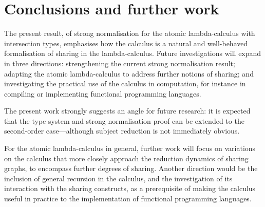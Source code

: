 \documentclass[orivec]{llncs}
\begin{document}
% 
\section{Conclusions and further work}



The present result, of strong normalisation for the atomic lambda-calculus with intersection types, emphasises how the calculus is a natural and well-behaved formalisation of sharing in the lambda-calculus.
%
Future investigations will expand in three directions: strengthening the current strong normalisation result; adapting the atomic lambda-calculus to address further notions of sharing; and investigating the practical use of the calculus in computation, for instance in compiling or implementing functional programming languages.



The present work strongly suggests an angle for future research: it is expected that the type system and strong normalisation proof can be extended to the second-order case---although subject reduction is not immediately obvious.%


For the atomic lambda-calculus in general, further work will focus on variations on the calculus that more closely approach the reduction dynamics of sharing graphs, to encompass further degrees of sharing.
%
Another direction would be the inclusion of general recursion in the calculus, and the investigation of its interaction with the sharing constructs, as a prerequisite of making the calculus useful in practice to the implementation of functional programming languages.






\newpage


\end{document}
